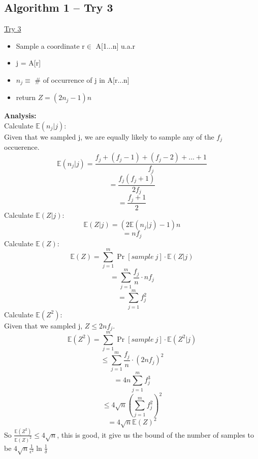 \documentclass[11pt]{article}
\begin{document}
\subsection{Algorithm 1 -- Try 3}
\begin{mdframed}[backgroundcolor=blue!05,topline=false,bottomline=false,leftline=false,rightline=false] 
	\underline{\sc Try 3}
	\begin{itemize}
		\item Sample a coordinate r$\in$ A[1...n] u.a.r
		\item j = A[r]
		\item $n_j \equiv$ \# of occurrence of j in A[r...n]
		\item return $Z=(2n_j - 1)n$
	\end{itemize}
\end{mdframed}
\textbf{Analysis:}\\
Calculate $\mathbb{E}(n_j|j)$:\\
Given that we sampled j, we are equally likely to sample any of the $f_j$ occuerence. 
$$\mathbb{E}(n_j|j) = \frac{f_j+(f_j-1)+(f_j-2)+...+1}{f_j}$$
$$=\frac{f_j(f_j+1)}{2f_j}$$
$$=\frac{f_j+1}{2}$$
Calculate $\mathbb{E}(Z|j)$:\\
$$\mathbb{E}(Z|j) = (2\mathbb{E}(n_j|j)-1)n$$
$$=n f_j$$
Calculate $\mathbb{E}(Z)$:\\
$$\mathbb{E}(Z) = \sum_{j=1}^m \Pr[sample\ j]\cdot\mathbb{E}(Z|j)$$
$$=\sum_{j=1}^m \frac{f_j}{n}\cdot nf_j$$
$$=\sum_{j=1}^m f_j^2$$
Calculate $\mathbb{E}(Z^2)$:\\
Given that we sampled j, $Z\leq 2nf_j$.
$$\mathbb{E}(Z^2) = \sum_{j=1}^m \Pr[sample\ j]\cdot\mathbb{E}(Z^2|j)$$
$$\leq \sum_{j=1}^m \frac{f_j}{n}\cdot (2nf_j)^2$$
$$= 4n\sum_{j=1}^m f_j^3$$
$$\leq 4\sqrt{n}(\sum_{j=1}^m f_j^2)^2$$
$$= 4\sqrt{n}\mathbb{E}(Z)^2$$
So $\frac{\mathbb{E}(Z^2)}{\mathbb{E}(Z)^2} \leq 4\sqrt{n}$, this is good, it give us the bound of the number of samples to be $4\sqrt{n}\frac{1}{\epsilon^2}\ln{\frac{1}{\delta}}$ 
\end{document}
